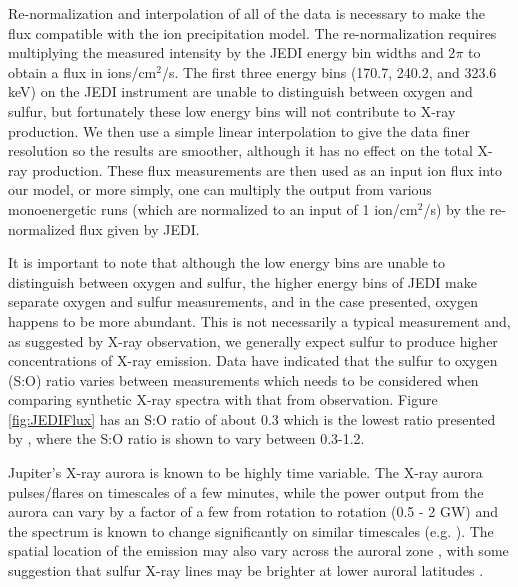 \documentclass[draft]{agujournal2018}
\begin{document}
Re-normalization and interpolation of all of the data is necessary to make the flux compatible with the ion precipitation model.
The re-normalization requires multiplying the measured intensity by the JEDI energy bin widths \citep{mauk2017ssr} and 2$\pi$ to obtain a flux in ions/cm$^2$/s.
The first three energy bins (170.7, 240.2, and 323.6 keV) on the JEDI instrument are unable to distinguish between oxygen and sulfur, but fortunately these low energy bins will not contribute to X-ray production.
We then use a simple linear interpolation to give the data finer resolution so the results are smoother, although it has no effect on the total X-ray production.
These flux measurements are then used as an input ion flux into our model, or more simply, one can multiply the output from various monoenergetic runs (which are normalized to an input of 1 ion/cm$^2$/s) by the re-normalized flux given by JEDI.

It is important to note that although the low energy bins are unable to distinguish between oxygen and sulfur, the higher energy bins of JEDI make separate oxygen and sulfur measurements, and in the case presented, oxygen happens to be more abundant.
This is not necessarily a typical measurement and, as suggested by X-ray observation, we generally expect sulfur to produce higher concentrations of X-ray emission.
Data have indicated that the sulfur to oxygen (S:O) ratio varies between measurements \citep{delamere2005,dougherty2017,kim2019} which needs to be considered when comparing synthetic X-ray spectra with that from observation.
Figure \ref{fig:JEDIFlux} has an S:O ratio of about 0.3 which is the lowest ratio presented by \citet{radioti2005,radioti2006}, where the S:O ratio is shown to vary between 0.3-1.2.

Jupiter's X-ray aurora is known to be highly time variable.
The X-ray aurora pulses/flares on timescales of a few minutes, while the power output from the aurora can vary by a factor of a few from rotation to rotation (0.5 - 2 GW) and the spectrum is known to change significantly on similar timescales (e.g. \citet{branduardi2007,elsner2005,hui2010}).
The spatial location of the emission may also vary across the auroral zone \citep{dunn2017,gladstone2002,jackman2018}, with some suggestion that sulfur X-ray lines may be brighter at lower auroral latitudes \citep{dunn2016}.
\end{document}
